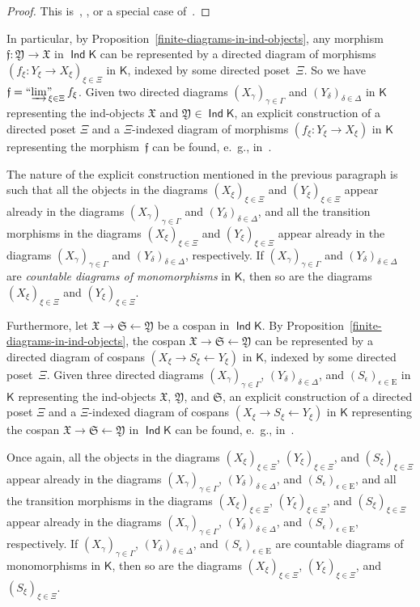 \documentclass[12pt,a4paper]{amsart}
\newcommand{\+}{\protect\nobreakdash-}
\renewcommand{\:}{\colon}
\newcommand{\rarrow}{\longrightarrow}
\newcommand{\larrow}{\longleftarrow}
\DeclareMathOperator{\Ind}{\mathsf{Ind}}
\newcommand{\ilim}
 {\mathop{\text{\normalfont``$\varinjlim$''\!\!}}\nolimits}
\newcommand{\rE}{\mathrm E}
\newcommand{\sK}{\mathsf K}
\newcommand{\fX}{\mathfrak X}
\newcommand{\fY}{\mathfrak Y}
\newcommand{\fS}{\mathfrak S}
\newcommand{\ff}{\mathfrak f}
\theoremstyle{plain}
\theoremstyle{definition}
\begin{document}
\begin{proof}
 This is~\cite[Expos\'e~I, Proposition~8.8.5]{SGA4},
\cite[page~55]{Mey}, or a special case of~\cite[Theorem~1.3]{Hen}.
\end{proof}

 In particular, by Proposition~\ref{finite-diagrams-in-ind-objects},
any morphism $\ff\:\fY\rarrow\fX$ in $\Ind\sK$ can be represented by
a directed diagram of morphisms $(f_\xi\: Y_\xi\to X_\xi)_{\xi\in\Xi}$
in $\sK$, indexed by some directed poset~$\Xi$.
 So we have $\ff=\ilim_{\xi\in\Xi}f_\xi$.
 Given two directed diagrams $(X_\gamma)_{\gamma\in\Gamma}$ and
$(Y_\delta)_{\delta\in\Delta}$ in $\sK$ representing the ind-objects
$\fX$ and $\fY\in\Ind\sK$, an explicit construction of a directed poset
$\Xi$ and a $\Xi$\+indexed diagram of morphisms $(f_\xi\:Y_\xi\to
X_\xi)$ in $\sK$ representing the morphism~$\ff$ can be found, e.~g.,
in~\cite[Section~9]{Pextop}.

 The nature of the explicit construction mentioned in the previous
paragraph is such that all the objects in the diagrams
$(X_\xi)_{\xi\in\Xi}$ and $(Y_\xi)_{\xi\in\Xi}$ appear already in
the diagrams $(X_\gamma)_{\gamma\in\Gamma}$ and
$(Y_\delta)_{\delta\in\Delta}$, and all the transition morphisms in
the diagrams $(X_\xi)_{\xi\in\Xi}$ and $(Y_\xi)_{\xi\in\Xi}$ appear
already in the diagrams $(X_\gamma)_{\gamma\in\Gamma}$ and
$(Y_\delta)_{\delta\in\Delta}$, respectively.
 If $(X_\gamma)_{\gamma\in\Gamma}$ and $(Y_\delta)_{\delta\in\Delta}$
are \emph{countable diagrams of monomorphisms} in $\sK$, then so
are the diagrams $(X_\xi)_{\xi\in\Xi}$ and $(Y_\xi)_{\xi\in\Xi}$.

 Furthermore, let $\fX\rarrow\fS\larrow\fY$ be a cospan in $\Ind\sK$.
 By Proposition~\ref{finite-diagrams-in-ind-objects}, the cospan
$\fX\rarrow\fS\larrow\fY$ can be represented by a directed diagram of
cospans $(X_\xi\rightarrow S_\xi\leftarrow Y_\xi)$ in $\sK$,
indexed by some directed poset~$\Xi$.
 Given three directed diagrams $(X_\gamma)_{\gamma\in\Gamma}$,
$(Y_\delta)_{\delta\in\Delta}$, and $(S_\epsilon)_{\epsilon\in\rE}$
in $\sK$ representing the ind-objects $\fX$, $\fY$, and $\fS$,
an explicit construction of a directed poset $\Xi$ and a $\Xi$\+indexed
diagram of cospans $(X_\xi\rightarrow S_\xi\leftarrow Y_\xi)$ in $\sK$
representing the cospan $\fX\rarrow\fS\larrow\fY$ in $\Ind\sK$ can be
found, e.~g., in~\cite[Section~1.1]{Psemten}.

 Once again, all the objects in the diagrams $(X_\xi)_{\xi\in\Xi}$,
$(Y_\xi)_{\xi\in\Xi}$, and $(S_\xi)_{\xi\in\Xi}$ appear already in
the diagrams $(X_\gamma)_{\gamma\in\Gamma}$,
$(Y_\delta)_{\delta\in\Delta}$, and $(S_\epsilon)_{\epsilon\in\rE}$,
and all the transition morphisms in the diagrams $(X_\xi)_{\xi\in\Xi}$,
$(Y_\xi)_{\xi\in\Xi}$, and $(S_\xi)_{\xi\in\Xi}$ appear already
in the diagrams $(X_\gamma)_{\gamma\in\Gamma}$,
$(Y_\delta)_{\delta\in\Delta}$, and $(S_\epsilon)_{\epsilon\in\rE}$,
respectively.
 If $(X_\gamma)_{\gamma\in\Gamma}$, $(Y_\delta)_{\delta\in\Delta}$,
and $(S_\epsilon)_{\epsilon\in\rE}$ are countable diagrams of
monomorphisms in $\sK$, then so are the diagrams $(X_\xi)_{\xi\in\Xi}$, $(Y_\xi)_{\xi\in\Xi}$, and $(S_\xi)_{\xi\in\Xi}$.
\end{document}
